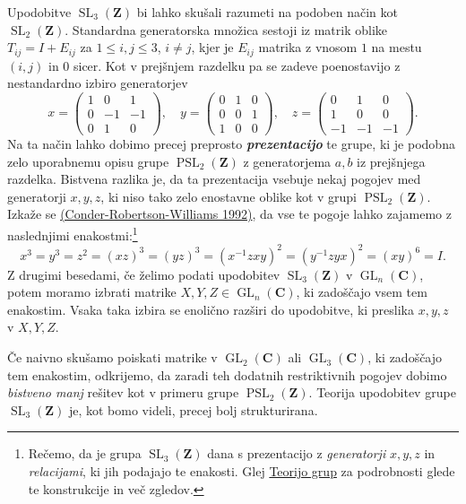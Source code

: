 \documentclass[11pt]{book}
\def\ZZ{\mathbf{Z}}
\def\CC{\mathbf{C}}
\DeclareMathOperator\GL{GL}
\DeclareMathOperator\SL{SL}
\DeclareMathOperator\PSL{PSL}
\def\definicija{\color{rdeca}\bf\em}
\theoremstyle{definition}
\theoremstyle{zgled}
\theoremstyle{odprtproblem}
\theoremstyle{domacanaloga}
\theoremstyle{izrek}
\begin{document}
Upodobitve $\SL_3(\ZZ)$ bi lahko skušali razumeti na podoben način kot $\SL_2(\ZZ)$. Standardna generatorska množica sestoji iz matrik oblike $T_{ij} = I + E_{ij}$ za $1 \leq i, j \leq 3$, $i \neq j$, kjer je $E_{ij}$ matrika z vnosom $1$ na mestu $(i,j)$ in $0$ sicer. Kot v prejšnjem razdelku pa se zadeve poenostavijo z nestandardno izbiro generatorjev
\[
    x =
    \begin{pmatrix}
        1 &  0 &  1 \\
        0 & -1 & -1 \\
        0 &  1 &  0
    \end{pmatrix}, \quad
    y =
    \begin{pmatrix}
        0 &  1 &  0 \\
        0 &  0 &  1 \\
        1 &  0 &  0
    \end{pmatrix}, \quad
    z =
    \begin{pmatrix}
        0 &  1 &  0 \\
        1 &  0 &  0 \\
       -1 & -1 & -1
    \end{pmatrix}.  
\]
Na ta način lahko dobimo precej preprosto {\definicija prezentacijo} te grupe, ki je podobna zelo uporabnemu opisu grupe $\PSL_2(\ZZ)$ z generatorjema $a,b$ iz prejšnjega razdelka. Bistvena razlika je, da ta prezentacija vsebuje nekaj pogojev med generatorji $x,y,z$, ki niso tako zelo enostavne oblike kot v grupi $\PSL_2(\ZZ)$. Izkaže se \href{https://www.ams.org/proc/1992-115-01/S0002-9939-1992-1079696-5/}{(Conder-Robertson-Williams 1992)}, da vse te pogoje lahko zajamemo z naslednjimi enakostmi:\footnote{Rečemo, da je grupa $\SL_3(\ZZ)$ dana s prezentacijo z \emph{generatorji} $x,y,z$ in \emph{relacijami}, ki jih podajajo te enakosti. Glej \href{https://urbanjezernik.github.io/teorija-grup}{Teorijo grup} za podrobnosti glede te konstrukcije in več zgledov.}
\[
    x^3 = y^3 = z^2 = (xz)^3 = (yz)^3 = (x^{-1}zxy)^2 = (y^{-1}zyx)^2 = (xy)^6 = I.
\]
Z drugimi besedami, če želimo podati upodobitev $\SL_3(\ZZ)$ v $\GL_n(\CC)$, potem moramo izbrati matrike $X,Y,Z \in \GL_n(\CC)$, ki zadoščajo vsem tem enakostim. Vsaka taka izbira se enolično razširi do upodobitve, ki preslika $x,y,z$ v $X,Y,Z$.

Če naivno skušamo poiskati matrike v $\GL_2(\CC)$ ali $\GL_3(\CC)$, ki zadoščajo tem enakostim, odkrijemo, da zaradi teh dodatnih restriktivnih pogojev dobimo \emph{bistveno manj} rešitev kot v primeru grupe $\PSL_2(\ZZ)$. Teorija upodobitev grupe $\SL_3(\ZZ)$ je, kot bomo videli, precej bolj strukturirana.
\end{document}

